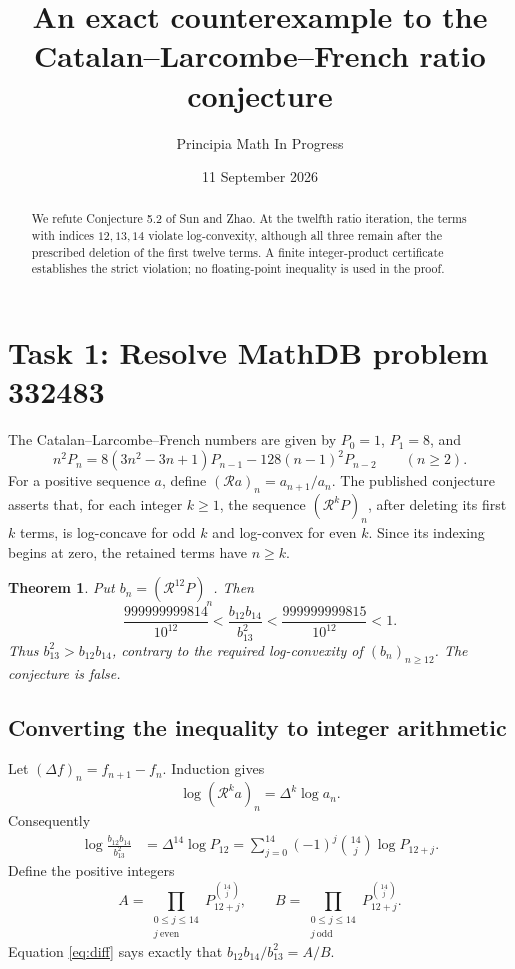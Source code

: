 \documentclass[11pt]{article}
\title{An exact counterexample to the\\Catalan--Larcombe--French ratio conjecture}
\author{Principia Math In Progress}
\date{11 September 2026}
\newtheorem{theorem}{Theorem}
\begin{document}
\maketitle
\begin{abstract}
We refute Conjecture 5.2 of Sun and Zhao. At the twelfth ratio iteration,
the terms with indices $12,13,14$ violate log-convexity, although all
three remain after the prescribed deletion of the first twelve terms.
A finite integer-product certificate establishes the strict violation;
no floating-point inequality is used in the proof.
\end{abstract}

\section*{Task 1: Resolve MathDB problem 332483}
The Catalan--Larcombe--French numbers are given by $P_0=1$, $P_1=8$,
and
\begin{equation}\label{eq:rec}
 n^2P_n=8(3n^2-3n+1)P_{n-1}-128(n-1)^2P_{n-2}\qquad(n\geq2).
\end{equation}
For a positive sequence $a$, define
$(\mathcal Ra)_n=a_{n+1}/a_n$.
The published conjecture \cite[Conjecture 5.2, p.~601]{source} asserts
that, for each integer $k\geq1$, the sequence
$(\mathcal R^kP)_n$, after deleting its first $k$ terms, is
log-concave for odd $k$ and log-convex for even $k$.
Since its indexing begins at zero, the retained terms have $n\geq k$.

\begin{theorem}\label{thm:counter}
Put $b_n=(\mathcal R^{12}P)_n$. Then
\begin{equation}\label{eq:main}
 \frac{999999999814}{10^{12}}
 <\frac{b_{12}b_{14}}{b_{13}^2}
 <\frac{999999999815}{10^{12}}<1.
\end{equation}
Thus $b_{13}^2>b_{12}b_{14}$, contrary to the required log-convexity
of $(b_n)_{n\geq12}$. The conjecture is false.
\end{theorem}

\subsection*{Converting the inequality to integer arithmetic}
Let $(\Delta f)_n=f_{n+1}-f_n$. Induction gives
\[
 \log(\mathcal R^ka)_n=\Delta^k\log a_n.
\]
Consequently
\begin{align}
 \log\frac{b_{12}b_{14}}{b_{13}^2}
 &=\Delta^{14}\log P_{12}
   =\sum_{j=0}^{14}(-1)^j\binom{14}j\log P_{12+j}.
 \label{eq:diff}
\end{align}
Define the positive integers
\begin{equation}\label{eq:products}
 A=\prod_{\substack{0\leq j\leq14\\j\ \mathrm{even}}}
       P_{12+j}^{\binom{14}j},\qquad
 B=\prod_{\substack{0\leq j\leq14\\j\ \mathrm{odd}}}
       P_{12+j}^{\binom{14}j}.
\end{equation}
Equation \eqref{eq:diff} says exactly that
$b_{12}b_{14}/b_{13}^2=A/B$.
\end{document}
